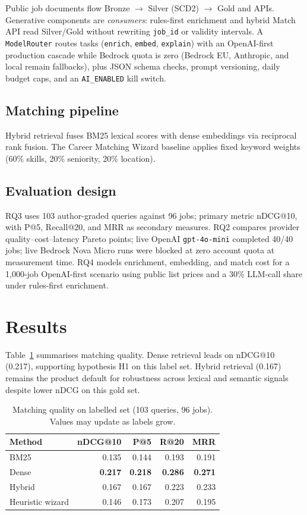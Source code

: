 \documentclass[conference]{IEEEtran}
\begin{document}
Public job documents flow Bronze $\rightarrow$ Silver (SCD2) $\rightarrow$ Gold and APIs.
Generative components are \emph{consumers}: rules-first enrichment and hybrid Match API read Silver/Gold without rewriting \texttt{job\_id} or validity intervals.
A \texttt{ModelRouter} routes tasks (\texttt{enrich}, \texttt{embed}, \texttt{explain}) with an OpenAI-first production cascade while Bedrock quota is zero (Bedrock EU, Anthropic, and local remain fallbacks), plus JSON schema checks, prompt versioning, daily budget caps, and an \texttt{AI\_ENABLED} kill switch.

\subsection{Matching pipeline}

Hybrid retrieval fuses BM25 lexical scores with dense embeddings via reciprocal rank fusion.
The Career Matching Wizard baseline applies fixed keyword weights (60\% skills, 20\% seniority, 20\% location).

\subsection{Evaluation design}

RQ3 uses 103 author-graded queries against 96 jobs; primary metric nDCG@10, with P@5, Recall@20, and MRR as secondary measures.
RQ2 compares provider quality--cost--latency Pareto points; live OpenAI \texttt{gpt-4o-mini} completed 40/40 jobs; live Bedrock Nova Micro runs were blocked at zero account quota at measurement time.
RQ4 models enrichment, embedding, and match cost for a 1{,}000-job OpenAI-first scenario using public list prices and a 30\% LLM-call share under rules-first enrichment.

\section{Results}
\label{sec:results}

Table~\ref{tab:rq3} summarises matching quality.
Dense retrieval leads on nDCG@10 (0.217), supporting hypothesis H1 on this label set.
Hybrid retrieval (0.167) remains the product default for robustness across lexical and semantic signals despite lower nDCG on this gold set.

\begin{table}[ht]
\centering
\caption{Matching quality on labelled set (103 queries, 96 jobs). Values may update as labels grow.}
\label{tab:rq3}
\begin{tabular}{@{}lrrrr@{}}
\toprule
Method & nDCG@10 & P@5 & R@20 & MRR \\
\midrule
BM25 & 0.135 & 0.144 & 0.193 & 0.191 \\
Dense & \textbf{0.217} & \textbf{0.218} & \textbf{0.286} & \textbf{0.271} \\
Hybrid & 0.167 & 0.167 & 0.223 & 0.233 \\
Heuristic wizard & 0.146 & 0.173 & 0.207 & 0.195 \\
\bottomrule
\end{tabular}
\end{table}
\end{document}
